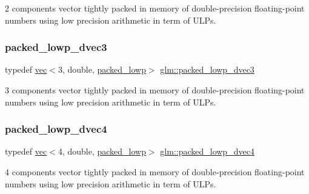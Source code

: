 2 components vector tightly packed in memory of double-\/precision floating-\/point numbers using low precision arithmetic in term of U\+L\+Ps. 

\mbox{\label{group__gtc__type__aligned_ga1e9e7d228165ce69595237084e2c1458}} 
\subsubsection{\texorpdfstring{packed\+\_\+lowp\+\_\+dvec3}{packed\_lowp\_dvec3}}
{\footnotesize\ttfamily typedef \hyperlink{structglm_1_1vec}{vec}$<$3, double, \hyperlink{namespaceglm_a36ed105b07c7746804d7fdc7cc90ff25ac36a4bd74559be2c0b65bc48e5953b8b}{packed\+\_\+lowp}$>$ \hyperlink{group__gtc__type__aligned_ga1e9e7d228165ce69595237084e2c1458}{glm\+::packed\+\_\+lowp\+\_\+dvec3}}



3 components vector tightly packed in memory of double-\/precision floating-\/point numbers using low precision arithmetic in term of U\+L\+Ps. 

\mbox{\label{group__gtc__type__aligned_ga54190c1986b9a3653bf49fddd81e753b}} 
\subsubsection{\texorpdfstring{packed\+\_\+lowp\+\_\+dvec4}{packed\_lowp\_dvec4}}
{\footnotesize\ttfamily typedef \hyperlink{structglm_1_1vec}{vec}$<$4, double, \hyperlink{namespaceglm_a36ed105b07c7746804d7fdc7cc90ff25ac36a4bd74559be2c0b65bc48e5953b8b}{packed\+\_\+lowp}$>$ \hyperlink{group__gtc__type__aligned_ga54190c1986b9a3653bf49fddd81e753b}{glm\+::packed\+\_\+lowp\+\_\+dvec4}}



4 components vector tightly packed in memory of double-\/precision floating-\/point numbers using low precision arithmetic in term of U\+L\+Ps. 

